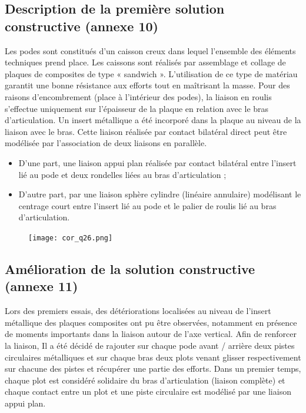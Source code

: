 \subsection{Description de la première solution constructive (annexe 10)}
\ifprof
\else
Les podes sont constitués d’un caisson creux dans lequel l’ensemble des éléments techniques prend place. Les caissons sont réalisés par assemblage et collage de plaques de composites de type « sandwich ». L’utilisation de ce
type de matériau garantit une bonne résistance aux efforts tout en maîtrisant la masse.
Pour des raisons d’encombrement (place à l’intérieur des podes), la liaison en roulis s’effectue uniquement sur l’épaisseur de la plaque en relation avec le bras d’articulation. Un insert métallique a été incorporé dans la plaque au niveau de la liaison avec le bras. Cette liaison réalisée par contact bilatéral direct peut être modélisée par l’association de deux liaisons en parallèle.
\begin{itemize}
\item D’une part, une liaison appui plan réalisée par contact bilatéral entre l’insert lié au pode et deux rondelles liées
au bras d’articulation ;
\item D’autre part, par une liaison sphère cylindre (linéaire annulaire) modélisant le centrage court entre l’insert lié
au pode et le palier de roulis lié au bras d’articulation.
\end{itemize}
\fi

\ifprof
\begin{corrige}
\begin{figure}[H]
\centering
\texttt{[image: cor\_q26.png]}
\end{figure}
\end{corrige}
\else
\fi



\subsection{Amélioration de la solution constructive (annexe 11)}
\ifprof
\else
Lors des premiers essais, des détériorations localisées au niveau de l’insert métallique des plaques composites ont pu être observées, notamment en présence de moments importants dans la liaison autour de l’axe vertical. Afin de
renforcer la liaison, Il a été décidé de rajouter sur chaque pode avant / arrière deux pistes circulaires métalliques et sur chaque bras deux plots venant glisser respectivement sur chacune des pistes et récupérer une partie des efforts.
Dans un premier temps, chaque plot est considéré solidaire du bras d’articulation (liaison complète) et chaque contact entre un plot et une piste circulaire est modélisé par une liaison appui plan.
\fi

